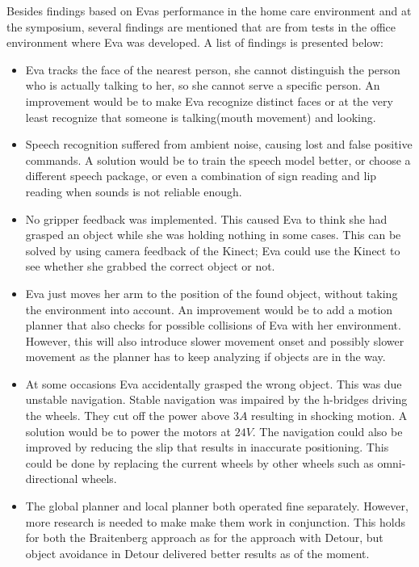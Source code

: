 \documentclass[project_eva.tex]{subfiles}
\begin{document}
Besides findings based on Eva\textquotesingle s performance in the home care environment and at the symposium, several findings are mentioned that are from tests in the office environment where Eva was developed. A list of findings is presented below:

\begin{itemize}
\item Eva tracks the face of the nearest person, she cannot distinguish the person who is actually talking to her, so she cannot serve a specific person. An improvement would be to make Eva recognize distinct faces or at the very least recognize that someone is talking(mouth movement) and looking.

\item Speech recognition suffered from ambient noise, causing lost and false positive commands. A solution would be to train the speech model better, or choose a different speech package, or even a combination of sign reading and lip reading when sounds is not reliable enough.

\item No gripper feedback was implemented. This caused Eva to think she had grasped an object while she was holding nothing in some cases. This can be solved by using camera feedback of the Kinect; Eva could use the Kinect to see whether she grabbed the correct object or not.

\item Eva just moves her arm to the position of the found object, without taking the environment into account. An improvement would be to add a motion planner that also checks for possible collisions of Eva with her environment. However, this will also introduce slower movement onset and possibly slower movement as the planner has to keep analyzing if objects are in the way.

\item  At some occasions Eva accidentally grasped the wrong object. This was due unstable navigation. Stable navigation was impaired by the h-bridges driving the wheels. They cut off the power above $3A$ resulting in shocking motion. A solution would be to power the motors at $24V$. The navigation could also be improved by reducing the slip  that results in inaccurate positioning. This could be done by replacing the current wheels by other wheels such as omni-directional wheels.

\item The global planner and local planner both operated fine separately. However, more research is needed to make make them work in conjunction. This holds for both the Braitenberg approach as for the approach with Detour, but object avoidance in Detour delivered better results as of the moment.


\end{itemize}
\end{document}

